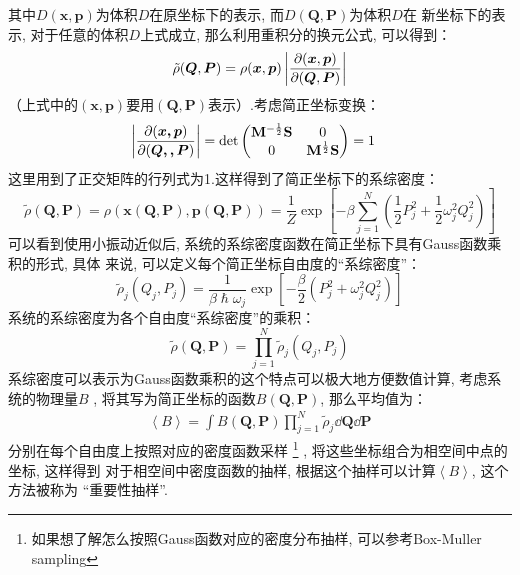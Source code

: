     其中$D(\bm{x},\bm{p})$为体积$D$在原坐标下的表示, 而$D(\bm{Q}, \bm{P})$为体积$D$在
    新坐标下的表示, 对于任意的体积$D$上式成立, 那么利用重积分的换元公式, 可以得到：
    \begin{equation}
        \tilde{\rho}(\bm{Q}, \bm{P}) = \rho(\bm{x}, \bm{p})\left|\frac{\partial{(\bm{x}, \bm{p})}}{\partial{(\bm{Q}, \bm{P})}}\right|
    \end{equation}
    （上式中的$(\bm{x}, \bm{p})$要用$(\bm{Q}, \bm{P})$表示）.考虑简正坐标变换：
    \begin{equation}
        \begin{aligned}
            \left|\frac {\partial (\bm{x,p})}{\partial (\bm{Q,,P})}\right| &= \det
            \begin{pmatrix}
                \mathbf{M}^{-\frac{1}{2}}\mathbf{S} & 0\\
                0 & \mathbf{M}^{\frac{1}{2}}\mathbf{S}
            \end{pmatrix}
            = 1
        \end{aligned}
    \end{equation}
    这里用到了正交矩阵的行列式为1.这样得到了简正坐标下的系综密度：
    \begin{equation}
        \tilde{\rho}(\bm{Q}, \bm{P}) = \rho(\bm{x}(\bm{Q}, \bm{P}), \bm{p}(\bm{Q}, \bm{P})) 
        = \frac{1}{Z}\exp\left[-\beta\sum_{j=1}^{N}\left(\frac{1}{2}P_{j}^{2} + \frac{1}{2}\omega_{j}^2 Q_{j}^{2}\right)\right] 
    \end{equation}
    可以看到使用小振动近似后, 系统的系综密度函数在简正坐标下具有Gauss函数乘积的形式, 具体
    来说, 可以定义每个简正坐标自由度的“系综密度”：
    \begin{equation}
        \tilde{\rho}_{j}(Q_j, P_j) = \frac {1}{\beta\hslash\omega_j} \exp\left[-\frac {\beta}2 (P_j^2 + \omega_j^2 Q_j^2)\right]
    \end{equation}
    系统的系综密度为各个自由度“系综密度”的乘积：
    \begin{equation}
        \tilde{\rho}(\bm{Q}, \bm{P}) = \prod_{j=1}^{N}\tilde{\rho}_{j}(Q_j, P_j)
    \end{equation}
    系综密度可以表示为Gauss函数乘积的这个特点可以极大地方便数值计算, 考虑系统的物理量$B$
    , 将其写为简正坐标的函数$B(\bm{Q}, \bm{P})$, 那么平均值为：
    \begin{equation}
        \begin{split}
            \left<B\right> = \int B(\bm{Q}, \bm{P})\prod_{j=1}^{N}\tilde{\rho}_j\dd \bm{Q}\dd \bm{P}
        \end{split}
    \end{equation}
    分别在每个自由度上按照对应的密度函数采样
    \footnote{
        如果想了解怎么按照Gauss函数对应的密度分布抽样, 可以参考Box-Muller sampling
    }
    , 将这些坐标组合为相空间中点的坐标, 这样得到
    对于相空间中密度函数的抽样, 根据这个抽样可以计算$\left<B\right>$, 这个方法被称为
    “重要性抽样”.



